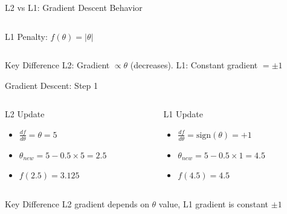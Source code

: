 \documentclass{beamer}
\begin{document}
\begin{frame}{L2 vs L1: Gradient Descent Behavior}
\begin{columns}
\begin{column}{0.5\textwidth}
\begin{keypointsbox}{L1 Penalty: $f(\theta) = |\theta|$}
\end{keypointsbox}
\end{column}
\end{columns}

\begin{examplebox}{Key Difference}
L2: Gradient $\propto \theta$ (decreases). L1: Constant gradient $= \pm 1$
\end{examplebox}
\end{frame}

\begin{frame}{Gradient Descent: Step 1}
\begin{columns}
\begin{column}{0.5\textwidth}
\begin{codebox}{L2 Update}
\begin{itemize}
\item $\frac{df}{d\theta} = \theta = 5$
\item $\theta_{new} = 5 - 0.5 \times 5 = 2.5$
\item $f(2.5) = 3.125$
\end{itemize}
\end{codebox}
\end{column}

\begin{column}{0.5\textwidth}
\begin{codebox}{L1 Update}
\begin{itemize}
\item $\frac{df}{d\theta} = \text{sign}(\theta) = +1$
\item $\theta_{new} = 5 - 0.5 \times 1 = 4.5$
\item $f(4.5) = 4.5$
\end{itemize}
\end{codebox}
\end{column}
\end{columns}

\begin{alertbox}{Key Difference}
L2 gradient depends on $\theta$ value, L1 gradient is constant $\pm 1$
\end{alertbox}
\end{frame}
\end{document}
